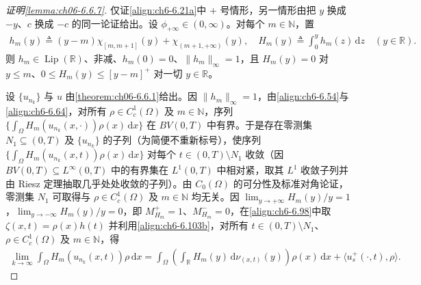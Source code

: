 \documentclass[../../main.tex]{subfiles}%
\begin{document}
\begin{proof}[证明\cref{lemma:ch06-6.6.7}]
仅证\eqref{align:ch6-6.21a}中 $+$ 号情形，另一情形由把 $y$ 换成 $-y$、$c$ 换成 $-c$ 的同一论证给出。设 $\phi_{+\infty}\in(0,\infty)$。对每个 $m\in\mathbb{N}$，置
\begin{align*}
h_m(y)\triangleq (y-m)\chi_{[m,m+1]}(y)+\chi_{(m+1,+\infty)}(y),\quad
H_m(y)\triangleq \int_0^y h_m(z)\,\mathrm{d}z \quad(y\in\mathbb{R}).
\end{align*}
则 $h_m\in\operatorname{Lip}(\mathbb{R})$、非减、$h_m(0)=0$、$\|h_m\|_\infty=1$，且 $H_m(y)=0$ 对 $y\leqslant m$、$0\leqslant H_m(y)\leqslant[y-m]^+$ 对一切 $y\in\mathbb{R}$。

设 $\{u_{n_k}\}$ 与 $u$ 由\cref{theorem:ch06-6.6.1}给出。因 $\|h_m\|_\infty=1$，由\eqref{align:ch6-6.54}与\eqref{align:ch6-6.64}，对所有 $\rho\in C^1_c(\Omega)$ 及 $m\in\mathbb{N}$，序列 $\{\int_\Omega H_m(u_{n_k}(x,\cdot))\rho(x)\,\mathrm{d}x\}$ 在 $BV(0,T)$ 中有界。于是存在零测集 $N_1\subseteq(0,T)$ 及 $\{u_{n_k}\}$ 的子列（为简便不重新标号），使序列 $\{\int_\Omega H_m(u_{n_k}(x,t))\rho(x)\,\mathrm{d}x\}$ 对每个 $t\in(0,T)\setminus N_1$ 收敛（因 $BV(0,T)\subseteq L^\infty(0,T)$ 中的有界集在 $L^1(0,T)$ 中相对紧，取其 $L^1$ 收敛子列并由 Riesz 定理抽取几乎处处收敛的子列）。由 $C_0(\Omega)$ 的可分性及标准对角论证，零测集 $N_1$ 可取得与 $\rho\in C^1_c(\Omega)$ 及 $m\in\mathbb{N}$ 均无关。因 $\lim_{y\to+\infty}H_m(y)/y=1$，$\lim_{y\to-\infty}H_m(y)/y=0$，即 $M^+_{H_m}=1$、$M^-_{H_m}=0$，在\eqref{align:ch6-6.98}中取 $\zeta(x,t)=\rho(x)h(t)$ 并利用\eqref{align:ch6-6.103b}，对所有 $t\in(0,T)\setminus N_1$、$\rho\in C^1_c(\Omega)$ 及 $m\in\mathbb{N}$，得
\begin{align}
\lim_{k\to\infty}\int_\Omega H_m(u_{n_k}(x,t))\rho\,\mathrm{d}x
=\int_\Omega\left(\int_\mathbb{R}H_m(y)\,\mathrm{d}\nu_{(x,t)}(y)\right)\rho(x)\,\mathrm{d}x
+\langle u^+_s(\cdot,t),\rho\rangle. \label{align:ch6-6.123}
\end{align}


\end{proof}
\end{document}
